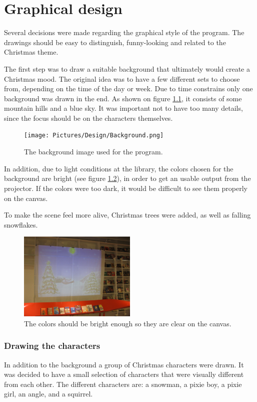 \chapter{Graphical design}\label{implementation}
Several decisions were made regarding the graphical style of the program. The drawings should be easy to distinguish, funny-looking and related to the Christmas theme. 

The first step was to draw a suitable background that ultimately would create a Christmas mood. The original idea was to have a few different sets to choose from, depending on the time of the day or week. Due to time constrains only one background was drawn in the end. As shown on figure \ref{fig:ip_Background}, it consists of some mountain hills and a blue sky. It was important not to have too many details, since the focus should be on the characters themselves.

\begin{figure}[htbp]
\centering
\texttt{[image: Pictures/Design/Background.png]}
\caption{The background image used for the program.}
\label{fig:ip_Background}
\end{figure}

In addition, due to light conditions at the library, the colors chosen for the background are bright (see figure \ref{fig:background_projector}), in order to get an usable output from the projector. If the colors were too dark, it would be difficult to see them properly on the canvas.

To make the scene feel more alive, Christmas trees were added, as well as falling snowflakes.

\begin{figure}[htbp]
\centering
\includegraphics[width=0.50\textwidth]{Pictures/Design/background_projector}
\caption{The colors should be bright enough so they are clear on the canvas.}
\label{fig:background_projector}
\end{figure}

\subsection{Drawing the characters}
In addition to the background a group of Christmas characters were drawn. It was decided to have a small selection of characters that were visually different from each other. The different characters are: a snowman, a pixie boy, a pixie girl, an angle, and a squirrel.

